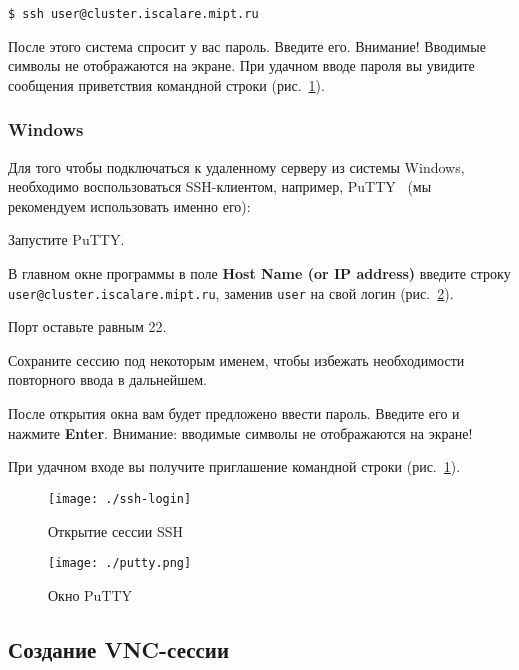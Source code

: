 \begin{lstlisting}
$ ssh user@cluster.iscalare.mipt.ru
\end{lstlisting}

После этого система спросит у вас пароль. Введите его. Внимание! Вводимые символы не отображаются на экране. При удачном вводе пароля вы увидите сообщения приветствия командной строки (рис.~\ref{fig:ssh-login}).

\subsubsection{Windows}

Для того чтобы подключаться к удаленному серверу из системы Windows, необходимо воспользоваться SSH-клиентом, например, PuTTY~\cite{putty} (мы рекомендуем использовать именно его):

\begin{enumerate*}
    \item Запустите PuTTY.
    \item В главном окне программы в поле \textbf{Host Name (or IP address)} введите строку \texttt{user@cluster.iscalare.mipt.ru}, заменив \texttt{user} на свой логин (рис.~\ref{fig:putty}).
    \item Порт оставьте равным 22.
    \item Сохраните сессию под некоторым именем, чтобы избежать необходимости повторного ввода в дальнейшем.
    \item После открытия окна вам будет предложено ввести пароль. Введите его и нажмите \textbf{Enter}. Внимание: вводимые символы не отображаются на экране!
    \item При удачном входе вы получите приглашение командной строки (рис.~\ref{fig:ssh-login}).
\end{enumerate*}

\begin{figure}[htb]
    \centering
    \texttt{[image: ./ssh-login]}
    \caption{Открытие сессии SSH}
    \label{fig:ssh-login}
\end{figure}

\begin{figure}[htb]
    \centering
    \texttt{[image: ./putty.png]}
    \caption{Окно PuTTY}
    \label{fig:putty}
\end{figure}

\subsection{Создание VNC-сессии}

